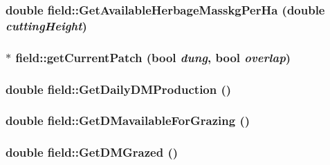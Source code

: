 \label{classfield_ac7b4f7eb002f1f49ce00734f2177cc87}
\hypertarget{classfield_aa89adadc9a47424d3bac9305baf57384}{
\subsubsection[{GetAvailableHerbageMasskgPerHa}]{\setlength{\rightskip}{0pt plus 5cm}double field::GetAvailableHerbageMasskgPerHa (double {\em cuttingHeight})}}
\label{classfield_aa89adadc9a47424d3bac9305baf57384}
\hypertarget{classfield_a1fe57d3640a5edae2ab2375a18044853}{
\subsubsection[{getCurrentPatch}]{ $\ast$ field::getCurrentPatch (bool {\em dung}, \/  bool {\em overlap})}}
\label{classfield_a1fe57d3640a5edae2ab2375a18044853}
\hypertarget{classfield_a3b566f2cfcd110bb6acdc6912d3ab3c9}{
\subsubsection[{GetDailyDMProduction}]{\setlength{\rightskip}{0pt plus 5cm}double field::GetDailyDMProduction ()}}
\label{classfield_a3b566f2cfcd110bb6acdc6912d3ab3c9}
\hypertarget{classfield_a4eeb65d29ddebdbfb177cd338c12bc3b}{
\subsubsection[{GetDMavailableForGrazing}]{\setlength{\rightskip}{0pt plus 5cm}double field::GetDMavailableForGrazing ()}}
\label{classfield_a4eeb65d29ddebdbfb177cd338c12bc3b}
\hypertarget{classfield_a2bb1e4784fca6aed504a2ab7d4f200a0}{
\subsubsection[{GetDMGrazed}]{\setlength{\rightskip}{0pt plus 5cm}double field::GetDMGrazed ()}}
